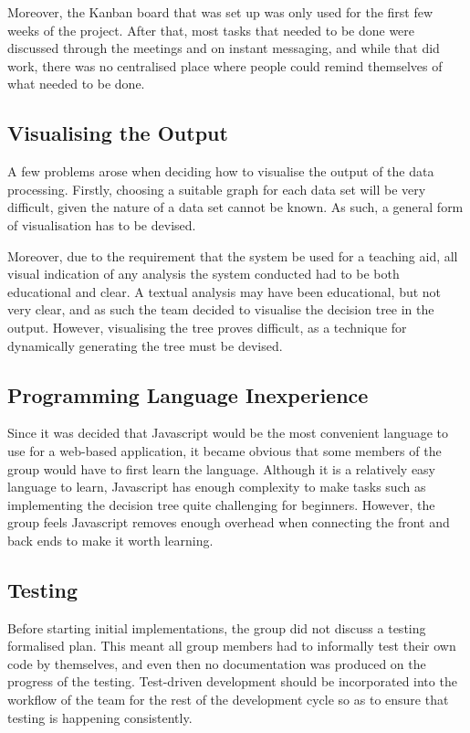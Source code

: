 \documentclass[a4paper,titlepage]{article}
\begin{document}
Moreover, the Kanban board that was set up was only used for the first few weeks of the project. 
After that, most tasks that needed to be done were discussed through the meetings and on instant messaging, and while that did work, there was no centralised place where people could remind themselves of what needed to be done.

\subsection{Visualising the Output}
A few problems arose when deciding how to visualise the output of the data processing. 
Firstly, choosing a suitable graph for each data set will be very difficult, given the nature of a data set cannot be known. 
As such, a general form of visualisation has to be devised. 

Moreover, due to the requirement that the system be used for a teaching aid, all visual indication of any analysis the system conducted had to be both educational and clear. 
A textual analysis may have been educational, but not very clear, and as such the team decided to visualise the decision tree in the output.
However, visualising the tree proves difficult, as a technique for dynamically generating the tree must be devised.

\subsection{Programming Language Inexperience}
Since it was decided that Javascript would be the most convenient language to use for a web-based application, it became obvious that some members of the group would have to first learn the language. 
Although it is a relatively easy language to learn, Javascript has enough complexity to make tasks such as implementing the decision tree quite challenging for beginners. 
However, the group feels Javascript removes enough overhead when connecting the front and back ends to make it worth learning.

\subsection{Testing}
Before starting initial implementations, the group did not discuss a testing formalised plan. 
This meant all group members had to informally test their own code by themselves, and even then no documentation was produced on the progress of the testing. 
Test-driven development should be incorporated into the workflow of the team for the rest of the development cycle so as to ensure that testing is happening consistently. 
\end{document}
